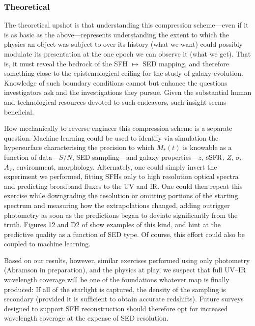 \documentclass[a4paper,fleqn,usenatbib]{mnras}
\newcommand{\Mstel}{M_\ast}
\newcommand{\ssfr}{{\rm sSFR}}
\begin{document}
\subsubsection{Theoretical}

The theoretical upshot is that understanding this compression scheme---even if it is as basic 
as the above---represents understanding the extent to which the
physics an object was subject to over its history (what we want) could possibly modulate its 
presentation at the one epoch we can observe it (what we get). That is, it must reveal the bedrock 
of the SFH $\mapsto$ SED mapping, and therefore something close to the epistemological 
ceiling for the study of galaxy evolution. Knowledge of such boundary conditions cannot but 
enhance the questions investigators ask and the investigations they pursue. Given the substantial 
human and technological resources devoted to such endeavors, such insight seems beneficial.

How mechanically to reverse engineer this compression scheme is a separate question. Machine learning 
could be used to identify via simulation the hypersurface characterising the precision to which 
$\Mstel(t)$ is knowable as a function of data---$S/N$, SED sampling---and galaxy 
properties---$z$, $\ssfr$, $Z$, $\sigma$, $A_{V}$, environment, morphology. Alternately, one
could simply invert the experiment we performed, fitting SFHs only to high resolution optical 
spectra and predicting broadband fluxes to the UV and IR. One could then repeat this exercise 
while downgrading the resolution or omitting portions of the starting spectrum and measuring how 
the extrapolations changed, adding outrigger photometry as soon as the predictions began to deviate
significantly from the truth. Figures 12 and D2 of \citet{Abramson20} show examples of this kind, 
and hint at the predictive quality as a function of SED type. Of course, this effort could also be coupled 
to machine learning.


Based on our results, however, similar exercises performed using only photometry 
(Abramson in preparation), and the physics at play, we suspect that full UV--IR 
wavelength coverage will be one of the foundations whatever map is finally produced: If all of 
the starlight is captured, the density of the sampling is secondary (provided it is sufficient
to obtain accurate redshifts). Future surveys designed to support SFH reconstruction should 
therefore opt for increased wavelength coverage at the expense of SED resolution. 
\end{document}

